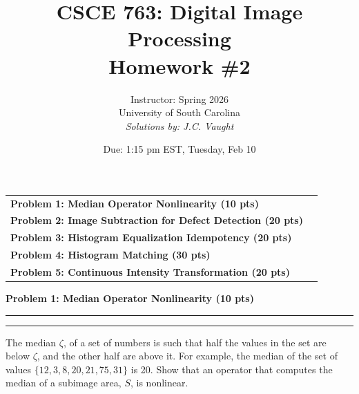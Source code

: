\documentclass[12pt]{article}
\title{CSCE 763: Digital Image Processing \\ Homework \#2}
\author{Instructor: Spring 2026 \\ University of South Carolina \\ \textit{Solutions by: J.C. Vaught}}
\date{Due: 1:15 pm EST, Tuesday, Feb 10}
\newcommand{\question}[1]{%
  \clearpage
  \vspace{0.5cm}
  {\noindent\normalsize \textbf{#1}}
  \vspace{0.2cm}
  \hrule
  \vspace{0.1cm}
  \hrule
  \vspace{0.3cm}
}
\begin{document}
\maketitle
\setlength{\parindent}{0pt}



\begin{center}
\begin{tcolorbox}[colback=white, colframe=gray!50!black, colbacktitle=gray!20!white,
                  coltitle=black, sharp corners, boxrule=1pt,
                  title=\Large\bfseries Table of Contents]
\begin{tabular}{p{}r}
\textbf{Problem 1: Median Operator Nonlinearity (10 pts)} \dotfill & \textbf{\pageref{quest:1}} \\[0.3em]
\textbf{Problem 2: Image Subtraction for Defect Detection (20 pts)} \dotfill & \textbf{\pageref{quest:2}} \\[0.3em]
\textbf{Problem 3: Histogram Equalization Idempotency (20 pts)} \dotfill & \textbf{\pageref{quest:3}} \\[0.3em]
\textbf{Problem 4: Histogram Matching (30 pts)} \dotfill & \textbf{\pageref{quest:4}} \\[0.3em]
\textbf{Problem 5: Continuous Intensity Transformation (20 pts)} \dotfill & \textbf{\pageref{quest:5}} \\
\end{tabular}
\vspace{0.2cm}
\end{tcolorbox}
\end{center}

\vspace{0.5cm}


\question{Problem 1: Median Operator Nonlinearity (10 pts)}\label{quest:1}

The median $\zeta$, of a set of numbers is such that half the values in the set are below $\zeta$, and the other half are above it. For example, the median of the set of values $\{12, 3, 8, 20, 21, 75, 31\}$ is 20. Show that an operator that computes the median of a subimage area, $S$, is nonlinear.
\end{document}
